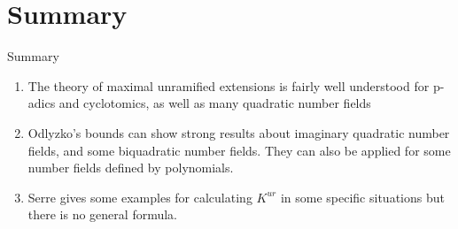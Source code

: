 \documentclass[10pt]{beamer}
\theoremstyle{plain} %
\begin{document}


\section{Summary}
\begin{frame}{Summary}
    \begin{enumerate}
        \item The theory of maximal unramified extensions is fairly well understood for p-adics and cyclotomics, as well as many quadratic number fields
         \item Odlyzko's bounds can show strong results about imaginary quadratic number fields, and some biquadratic number fields. They can also be applied for some number fields defined by polynomials. 
         \item Serre gives some examples for calculating $K^{ur}$ in some specific situations but there is no general formula. 
    \end{enumerate}
\end{frame}
\end{document}
